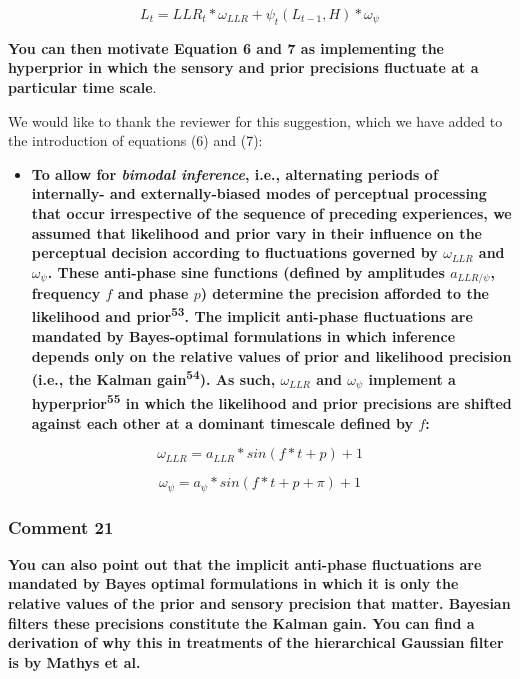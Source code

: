 \documentclass[
]{article}
\providecommand{\tightlist}{%
  \setlength{\itemsep}{0pt}\setlength{\parskip}{0pt}}
\begin{document}
\begin{equation}
L_t = LLR_t * \omega_{LLR} + \psi_t(L_{t-1}, H) * \omega_{\psi}
\end{equation}

\textbf{You can then motivate Equation 6 and 7 as implementing the
hyperprior in which the sensory and prior precisions fluctuate at a
particular time scale}.

We would like to thank the reviewer for this suggestion, which we have
added to the introduction of equations (6) and (7):

\begin{itemize}
\tightlist
\item
  \textbf{To allow for \emph{bimodal inference}, i.e., alternating
  periods of internally- and externally-biased modes of perceptual
  processing that occur irrespective of the sequence of preceding
  experiences, we assumed that likelihood and prior vary in their
  influence on the perceptual decision according to fluctuations
  governed by \(\omega_{LLR}\) and \(\omega_{\psi}\). These anti-phase
  sine functions (defined by amplitudes \(a_{LLR/\psi}\), frequency
  \(f\) and phase \(p\)) determine the precision afforded to the
  likelihood and prior\textsuperscript{53}. The implicit anti-phase
  fluctuations are mandated by Bayes-optimal formulations in which
  inference depends only on the relative values of prior and likelihood
  precision (i.e., the Kalman gain\textsuperscript{54}). As such,
  \(\omega_{LLR}\) and \(\omega_{\psi}\) implement a
  hyperprior\textsuperscript{55} in which the likelihood and prior
  precisions are shifted against each other at a dominant timescale
  defined by \(f\):}
\end{itemize}

\begin{equation}
\omega_{LLR} = a_{LLR} * sin(f * t + p) + 1
\end{equation}

\begin{equation}
\omega_{\psi} = a_{\psi} * sin(f * t + p + \pi) + 1
\end{equation}

\hypertarget{comment-21}{%
\subsubsection{Comment 21}\label{comment-21}}

\textbf{You can also point out that the implicit anti-phase fluctuations
are mandated by Bayes optimal formulations in which it is only the
relative values of the prior and sensory precision that matter. Bayesian
filters these precisions constitute the Kalman gain. You can find a
derivation of why this in treatments of the hierarchical Gaussian filter
is by Mathys et al.}
\end{document}
